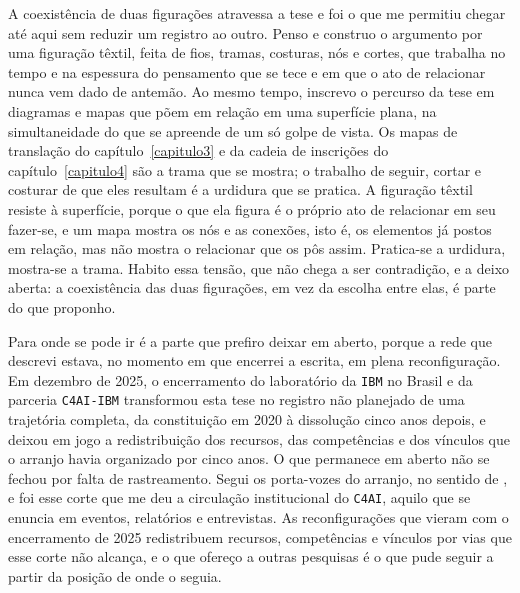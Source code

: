 A coexistência de duas figurações atravessa a tese e foi o que me permitiu chegar até aqui sem reduzir um registro ao outro. Penso e construo o argumento por uma figuração têxtil, feita de fios, tramas, costuras, nós e cortes, que trabalha no tempo e na espessura do pensamento que se tece e em que o ato de relacionar nunca vem dado de antemão. Ao mesmo tempo, inscrevo o percurso da tese em diagramas e mapas que põem em relação em uma superfície plana, na simultaneidade do que se apreende de um só golpe de vista. Os mapas de translação do capítulo~\ref{capitulo3} e da cadeia de inscrições do capítulo~\ref{capitulo4} são a trama que se mostra; o trabalho de seguir, cortar e costurar de que eles resultam é a urdidura que se pratica. A figuração têxtil resiste à superfície, porque o que ela figura é o próprio ato de relacionar em seu fazer-se, e um mapa mostra os nós e as conexões, isto é, os elementos já postos em relação, mas não mostra o relacionar que os pôs assim. Pratica-se a urdidura, mostra-se a trama. Habito essa tensão, que não chega a ser contradição, e a deixo aberta: a coexistência das duas figurações, em vez da escolha entre elas, é parte do que proponho.

Para onde se pode ir é a parte que prefiro deixar em aberto, porque a rede que descrevi estava, no momento em que encerrei a escrita, em plena reconfiguração. Em dezembro de 2025, o encerramento do laboratório da \texttt{IBM} no Brasil e da parceria \texttt{C4AI-IBM} transformou esta tese no registro não planejado de uma trajetória completa, da constituição em 2020 à dissolução cinco anos depois, e deixou em jogo a redistribuição dos recursos, das competências e dos vínculos que o arranjo havia organizado por cinco anos. O que permanece em aberto não se fechou por falta de rastreamento. Segui os porta-vozes do arranjo, no sentido de \textcite{strathern2011cortando}, e foi esse corte que me deu a circulação institucional do \texttt{C4AI}, aquilo que se enuncia em eventos, relatórios e entrevistas. As reconfigurações que vieram com o encerramento de 2025 redistribuem recursos, competências e vínculos por vias que esse corte não alcança, e o que ofereço a outras pesquisas é o que pude seguir a partir da posição de onde o seguia. 

